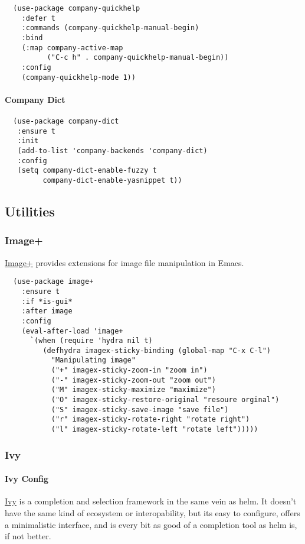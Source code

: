 \documentclass[11pt]{article}
\begin{document}
\begin{verbatim}
  (use-package company-quickhelp
    :defer t
    :commands (company-quickhelp-manual-begin)
    :bind
    (:map company-active-map
          ("C-c h" . company-quickhelp-manual-begin))
    :config
    (company-quickhelp-mode 1))
\end{verbatim}

\paragraph*{Company Dict}
\label{sec:orgf4d7107}

\begin{verbatim}
  (use-package company-dict
   :ensure t
   :init
   (add-to-list 'company-backends 'company-dict)
   :config
   (setq company-dict-enable-fuzzy t
         company-dict-enable-yasnippet t))
\end{verbatim}

\subsection*{Utilities}
\label{sec:org7a90020}
\subsubsection*{Image+}
\label{sec:org10f386b}

\href{https://github.com/mhayashi1120/Emacs-imagex}{Image+}  provides extensions for image file manipulation in Emacs.

\begin{verbatim}
  (use-package image+
    :ensure t
    :if *is-gui*
    :after image
    :config
    (eval-after-load 'image+
      `(when (require 'hydra nil t)
         (defhydra imagex-sticky-binding (global-map "C-x C-l")
           "Manipulating image"
           ("+" imagex-sticky-zoom-in "zoom in")
           ("-" imagex-sticky-zoom-out "zoom out")
           ("M" imagex-sticky-maximize "maximize")
           ("O" imagex-sticky-restore-original "resoure orginal")
           ("S" imagex-sticky-save-image "save file")
           ("r" imagex-sticky-rotate-right "rotate right")
           ("l" imagex-sticky-rotate-left "rotate left")))))
\end{verbatim}

\subsubsection*{Ivy}
\label{sec:org1357c2e}
\paragraph*{Ivy Config}
\label{sec:orgb50a575}
\href{https://github.com/abo-abo/swiper}{Ivy} is a completion and selection framework in the same vein
as helm.
It doesn't have the same kind of ecosystem or interopability,
but its easy to configure, offers a minimalistic interface,
and is every bit as good of a completion tool as helm is,
if not better.
\end{document}
